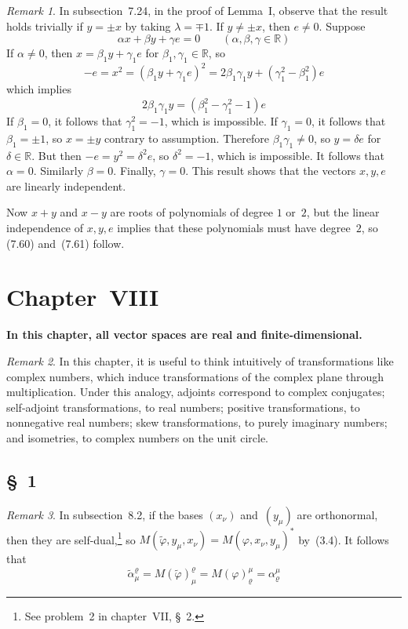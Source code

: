 \documentclass[letterpaper,12pt]{article}
\newcommand{\R}{\mathbb{R}}
\newcommand{\adj}[1]{\widetilde{#1}}
\theoremstyle{definition}
\theoremstyle{remark}
\newtheorem*{rmk}{Remark}
\begin{document}
\begin{rmk}
In subsection~7.24, in the proof of Lemma~I, observe that the result holds trivially if \(y=\pm x\) by taking \(\lambda=\mp 1\). If \(y\ne\pm x\), then \(e\ne 0\). Suppose
\[\alpha x+\beta y+\gamma e=0\qquad(\alpha,\beta,\gamma\in\R)\]
If \(\alpha\ne 0\), then \(x=\beta_1y+\gamma_1e\) for \(\beta_1,\gamma_1\in\R\), so
\[-e=x^2=(\beta_1y+\gamma_1e)^2=2\beta_1\gamma_1y+(\gamma_1^2-\beta_1^2)e\]
which implies
\[2\beta_1\gamma_1y=(\beta_1^2-\gamma_1^2-1)e\]
If \(\beta_1=0\), it follows that \(\gamma_1^2=-1\), which is impossible. If \(\gamma_1=0\), it follows that \(\beta_1=\pm 1\), so \(x=\pm y\) contrary to assumption. Therefore \(\beta_1\gamma_1\ne 0\), so \(y=\delta e\) for \(\delta\in\R\). But then \(-e=y^2=\delta^2 e\), so \(\delta^2=-1\), which is impossible. It follows that \(\alpha=0\). Similarly \(\beta=0\). Finally, \(\gamma=0\). This result shows that the vectors \(x,y,e\) are linearly independent.

Now \(x+y\) and \(x-y\) are roots of polynomials of degree \(1\) or~\(2\), but the linear independence of \(x,y,e\) implies that these polynomials must have degree~\(2\), so (7.60) and~(7.61) follow.
\end{rmk}

\section*{Chapter~VIII}
\textbf{In this chapter, all vector spaces are real and finite-dimensional.}

\begin{rmk}
In this chapter, it is useful to think intuitively of transformations like complex numbers, which induce transformations of the complex plane through multiplication. Under this analogy, adjoints correspond to complex conjugates; self-adjoint transformations, to real numbers; positive transformations, to nonnegative real numbers; skew transformations, to purely imaginary numbers; and isometries, to complex numbers on the unit circle.
\end{rmk}

\subsection*{\S~1}
\begin{rmk}
In subsection~8.2, if the bases \((x_{\nu})\) and~\((y_{\mu})\) are orthonormal, then they are self-dual,\footnote{See problem~2 in chapter~VII, \S~2.} so \(M(\adj{\varphi},y_{\mu},x_{\nu})=M(\varphi,x_{\nu},y_{\mu})^*\) by~(3.4). It follows that
\[\tilde{\alpha}^{\varrho}_{\mu}=M(\adj{\varphi})^{\varrho}_{\mu}=M(\varphi)^{\mu}_{\varrho}=\alpha^{\mu}_{\varrho}\]
\end{rmk}
\end{document}
